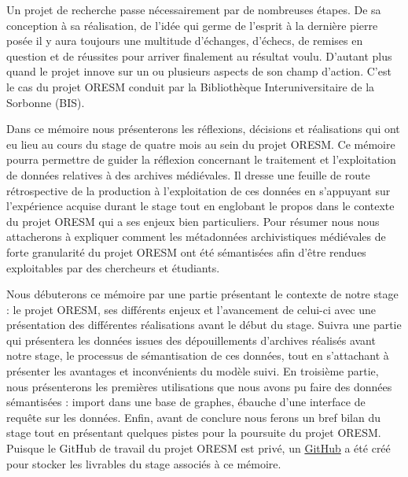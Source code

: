 Un projet de recherche passe nécessairement par de nombreuses étapes. De sa conception à sa réalisation, de l'idée qui germe de l'esprit à la dernière pierre posée il y aura toujours une multitude d'échanges, d'échecs, de remises en question et de réussites pour arriver finalement au résultat voulu. D'autant plus quand le projet innove sur un ou plusieurs aspects de son champ d'action. C'est le cas du projet ORESM conduit par la Bibliothèque Interuniversitaire de la Sorbonne (BIS).
\par
Dans ce mémoire nous présenterons les réflexions, décisions et réalisations qui ont eu lieu au cours du stage de quatre mois au sein du projet ORESM. Ce mémoire pourra permettre de guider la réflexion concernant le traitement et l'exploitation de données relatives à des archives médiévales. Il dresse une feuille de route rétrospective de la production à l'exploitation de ces données en s'appuyant sur l'expérience acquise durant le stage tout en englobant le propos dans le contexte du projet ORESM qui a ses enjeux bien particuliers. Pour résumer nous nous attacherons à expliquer comment les métadonnées archivistiques médiévales de forte granularité du projet ORESM ont été sémantisées afin d'être rendues exploitables par des chercheurs et étudiants.
\par
Nous débuterons ce mémoire par une partie présentant le contexte de notre stage : le projet ORESM, ses différents enjeux et l'avancement de celui-ci avec une présentation des différentes réalisations avant le début du stage. Suivra une partie qui présentera les données issues des dépouillements d'archives réalisés avant notre stage, le processus de sémantisation de ces données, tout en s'attachant à présenter les avantages et inconvénients du modèle suivi. En troisième partie, nous présenterons les premières utilisations que nous avons pu faire des données sémantisées : import dans une base de graphes, ébauche d'une interface de requête sur les données. Enfin, avant de conclure nous ferons un bref bilan du stage tout en présentant quelques pistes pour la poursuite du projet ORESM. Puisque le GitHub de travail du projet ORESM est privé, un \href{https://github.com/Florian-Langele/Memoire-de-stage-TNAH}{GitHub} a été créé pour stocker les livrables du stage associés à ce mémoire.